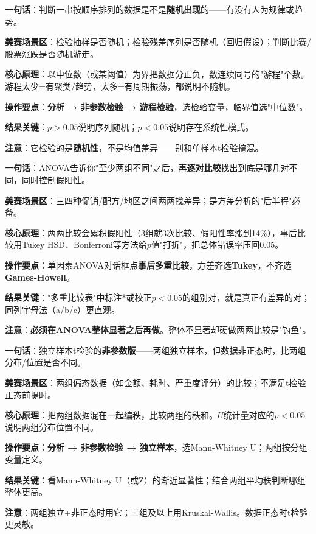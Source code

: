 
\begin{algobrief}
\textbf{一句话}：判断一串按顺序排列的数据是不是\textbf{随机出现}的——有没有人为规律或趋势。

\textbf{美赛场景区}：检验抽样是否随机；检验残差序列是否随机（回归假设）；判断比赛/股票涨跌是否随机游走。

\textbf{核心原理}：以中位数（或某阈值）为界把数据分正负，数连续同号的"游程"个数。游程太少=有聚类/趋势，太多=有周期振荡，都说明不随机。

\textbf{操作要点}：\textbf{分析 → 非参数检验 → 游程检验}，选检验变量，临界值选"中位数"。

\textbf{结果关键}：$p>0.05$说明序列随机；$p<0.05$说明存在系统性模式。

\textbf{注意}：它检验的是\textbf{随机性}，不是均值差异——别和单样本t检验搞混。
\end{algobrief}


\begin{algobrief}
\textbf{一句话}：ANOVA告诉你"至少两组不同"之后，再\textbf{逐对比较}找出到底是哪几对不同，同时控制假阳性。

\textbf{美赛场景区}：三四种促销/配方/地区之间两两找差异；是方差分析的"后半程"必备。

\textbf{核心原理}：两两比较会累积假阳性（3组就3次比较、假阳性率涨到14\%），事后比较用Tukey HSD、Bonferroni等方法给$p$值"打折"，把总体错误率压回0.05。

\textbf{操作要点}：单因素ANOVA对话框点\textbf{事后多重比较}，方差齐选\textbf{Tukey}，不齐选\textbf{Games-Howell}。

\textbf{结果关键}："多重比较表"中标注*或校正$p<0.05$的组别对，就是真正有差异的对；同列字母法（a/b/c）更直观。

\textbf{注意}：\textbf{必须在ANOVA整体显著之后再做}。整体不显著却硬做两两比较是"钓鱼"。
\end{algobrief}


\begin{algobrief}
\textbf{一句话}：独立样本t检验的\textbf{非参数版}——两组独立样本，但数据非正态时，比两组分布/位置是否不同。

\textbf{美赛场景区}：两组偏态数据（如金额、耗时、严重度评分）的比较；不满足t检验正态前提时。

\textbf{核心原理}：把两组数据混在一起编秩，比较两组的秩和。$U$统计量对应的$p<0.05$说明两组分布位置不同。

\textbf{操作要点}：\textbf{分析 → 非参数检验 → 独立样本}，选Mann-Whitney U；两组按分组变量定义。

\textbf{结果关键}：看Mann-Whitney U（或Z）的渐近显著性；结合两组平均秩判断哪组整体更高。

\textbf{注意}：两组独立+非正态时用它；三组及以上用Kruskal-Wallis。数据正态时t检验更灵敏。
\end{algobrief}

